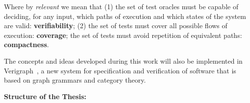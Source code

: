 Where by \emph{relevant} we mean that (1) the set of test oracles must be capable of deciding, for any input, which paths of execution and which states of the system are valid: \textbf{verifiability}; (2) the set of tests must cover all possible flows of execution: \textbf{coverage}; the set of tests must avoid repetition of equivalent paths: \textbf{compactness}.

The concepts and ideas developed during this work will also be implemented in Verigraph~\cite{verigraph,Costa2016}, a new system for specification and verification of software that is based on graph grammars and category theory.


\hfill \break
\textbf{Structure of the Thesis:}

